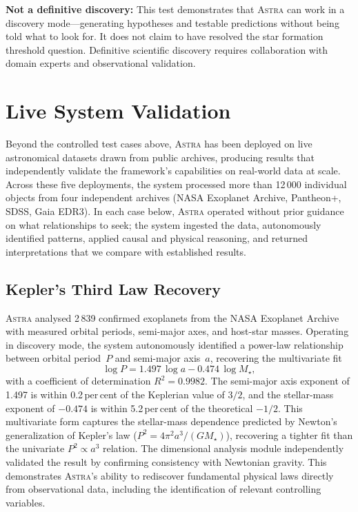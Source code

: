 \documentclass[fleqn,usenatbib]{mnras}
\newcommand{\astra}{\textsc{Astra}\xspace}
\begin{document}
\textbf{Not a definitive discovery:}
This test demonstrates that \astra can work in a discovery mode---generating hypotheses and testable predictions without being told what to look for.
It does not claim to have resolved the star formation threshold question.
Definitive scientific discovery requires collaboration with domain experts and observational validation.

\section{Live System Validation}
\label{sec:live}

Beyond the controlled test cases above, \astra has been deployed on live astronomical datasets drawn from public archives, producing results that independently validate the framework's capabilities on real-world data at scale.
Across these five deployments, the system processed more than 12\,000 individual objects from four independent archives (NASA Exoplanet Archive, Pantheon+, SDSS, Gaia EDR3).
In each case below, \astra operated without prior guidance on what relationships to seek; the system ingested the data, autonomously identified patterns, applied causal and physical reasoning, and returned interpretations that we compare with established results.

\subsection{Kepler's Third Law Recovery}
\label{sec:live:kepler}

\astra analysed 2\,839 confirmed exoplanets from the NASA Exoplanet Archive with measured orbital periods, semi-major axes, and host-star masses.
Operating in discovery mode, the system autonomously identified a power-law relationship between orbital period~$P$ and semi-major axis~$a$, recovering the multivariate fit
\begin{equation}
  \log P = 1.497\,\log a - 0.474\,\log M_{\star},
  \label{eq:kepler}
\end{equation}
with a coefficient of determination $R^{2} = 0.9982$.
The semi-major axis exponent of 1.497 is within 0.2\,per\,cent of the Keplerian value of $3/2$, and the stellar-mass exponent of $-0.474$ is within 5.2\,per\,cent of the theoretical $-1/2$.
This multivariate form captures the stellar-mass dependence predicted by Newton's generalization of Kepler's law ($P^{2} = 4\pi^{2} a^{3}/(GM_{\star})$), recovering a tighter fit than the univariate $P^{2} \propto a^{3}$ relation.
The dimensional analysis module independently validated the result by confirming consistency with Newtonian gravity.
This demonstrates \astra's ability to rediscover fundamental physical laws directly from observational data, including the identification of relevant controlling variables.
\end{document}
